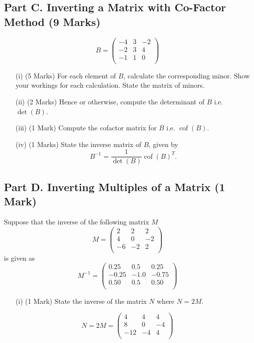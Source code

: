 \documentclass[a4paper,12pt]{article}
\begin{document}
	\subsection*{Part C. Inverting a Matrix with Co-Factor Method (9 Marks)}		
		\begin{equation*}
		B=\left( \begin{array}{rrr}
-4  &  3  & -2 \\
-2 &   3 &   4\\
-1 &   1  &  0\\
		\end{array} \right)
		\end{equation*}
	\begin{itemize}
		\item[(i)] (5 Marks) For each element of $B$, calculate the corresponding minor. Show your workings for each calculation. 
		State the matrix of minors.
		\item[(ii)] (2 Marks) Hence or otherwise, compute the determinant of $B$ i.e. $\det(B)$.
		\item[(iii)] (1 Mark) Compute the cofactor matrix for $B$ i.e. $\operatorname{cof}(B)$.
		\item[(iv)] (1 Marks) State the inverse matrix of $B$, given by
		\[ B^{-1}=\frac{1}{\det(B)}  \operatorname{cof}(B)^T. \]
	\end{itemize}
	\subsection*{Part D. Inverting Multiples of a Matrix  (1 Mark)}	
	Suppose that the inverse of the following matrix $M$ 
	\[M = \left(\begin{array}{rrr}
	2    & 2  &  2 \\
	4    & 0 &  -2\\
	-6   & -2 &   2\\
	\end{array}\right)\]
	is given as 
		\[M^{-1} = \left(\begin{array}{rrr}
0.25 & 0.5  & 0.25\\
-0.25 & -1.0& -0.75\\
 0.50 & 0.5 & 0.50\\
		\end{array}\right)\]
		
			\begin{itemize}
				\item[(i)] (1 Mark) State the inverse of the matrix $N$ where $N = 2M$.
				\end{itemize}
	\[
	N = 2M = \left(\begin{array}{rrr}
	4 &   4  &  4 \\
	8 &   0  & -4\\
	-12 &  -4  &  4\\
	\end{array}\right)
	\]
\newpage
\end{document}

